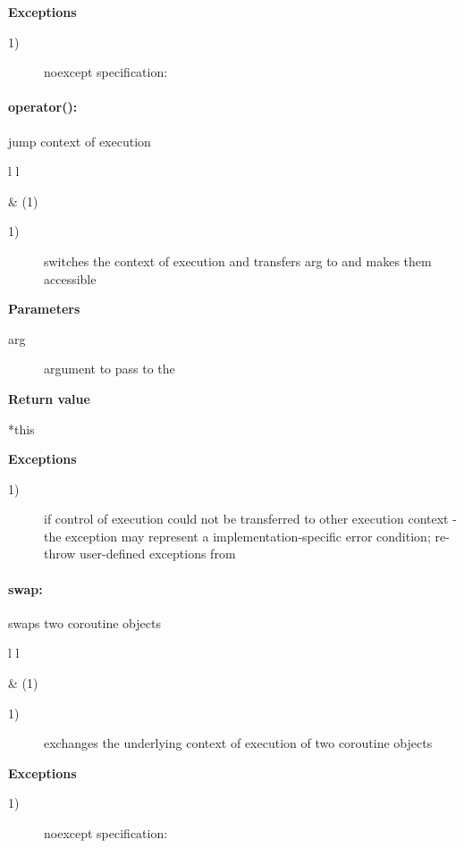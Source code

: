 {\bf Exceptions}
\begin{description}
    \item[1)] noexcept specification: 
\end{description}

\paragraph*{operator():}
jump context of execution\\

\begin{tabular}{ l l }
    \midrule

     & (1)\\

    \midrule
\end{tabular}

\begin{description}
    \item[1)] switches the context of execution and transfers arg to
              \corofunction and makes them accessible
\end{description}

{\bf Parameters}
\begin{description}
    \item[arg] argument to pass to the \corofunction
\end{description}

{\bf Return value}
\begin{description}
    \item[*this]
\end{description}

{\bf Exceptions}
\begin{description}
    \item[1)]  if control of execution could not be
              transferred to other execution context - the exception may
              represent a implementation-specific error condition; re-throw
              user-defined exceptions from \corofunction
\end{description}

\paragraph*{swap:}
swaps two coroutine objects\\

\begin{tabular}{ l l }
    \midrule

     & (1)\\

    \midrule
\end{tabular}

\begin{description}
    \item[1)] exchanges the underlying context of execution of two coroutine objects
\end{description}

{\bf Exceptions}
\begin{description}
    \item[1)] noexcept specification: 
\end{description}
